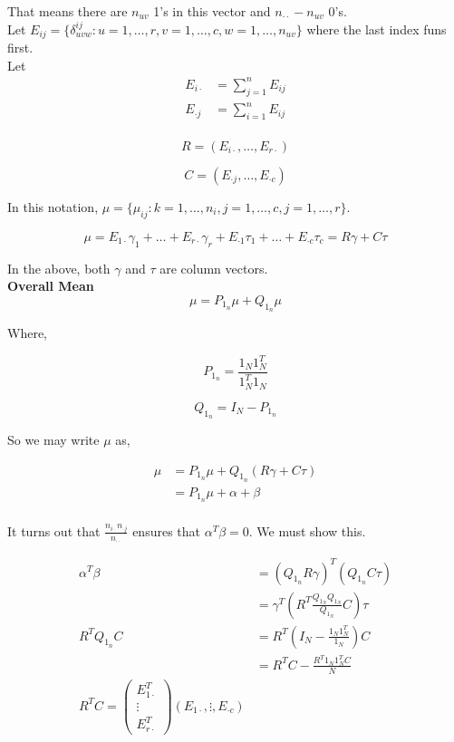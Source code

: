 \documentclass[11pt,fleqn]{book} %
\begin{document}
That means there are $n_{uv}$ 1's in this vector and $n_{\cdot \cdot} - n_{uv}$ 0's. \\

Let $E_{ij} = \{\delta^{ij}_{uvw}: u = 1, \dots, r, v = 1, \dots, c, w = 1, \dots, n_{uv}  \}$ where the last index funs first. \\

Let 	
		\begin{align}
			E_{i\cdot} &= \sum^n_{j=1} E_{ij}\\
			E_{\cdot j} &= \sum^n_{i=1} E_{ij}\\
		\end{align}


			$$R = \left(E_{i \cdot}, \dots, E_{r \cdot} \right) $$

			$$C = \left(E_{ \cdot j}, \dots, E_{\cdot c} \right) $$

In this notation, $\mu = \{\mu_{ij}: k = 1, \dots, n_i, j = 1, \dots, c, j = 1, \dots, r \}$. 

		$$\mu = E_{1\cdot} \gamma_1 + \dots + E_{r \cdot}\gamma_r + E_{\cdot 1} \tau_1 + \dots + E_{ \cdot c}\tau_c = R\gamma + C\tau $$

In the above, both $\gamma$ and $\tau$ are column vectors. \\

\textbf{Overall Mean}\\

		$$\mu = P_{1_n} \mu + Q_{1_n}\mu $$

Where, 

		$$P_{1_n} = \frac{1_N 1_N^T}{1_N^T 1_N} $$

		$$Q_{1_n} = I_N - P_{1_n} $$

So we may write $\mu$ as, 

	\begin{align*}
		 \mu &= P_{1_n} \mu + Q_{1_n}(R\gamma + C\tau)\\
		 		&= P_{1_n}\mu + \alpha + \beta\\
	\end{align*}

It turns out that $\frac{n_{i\cdot} n_{\cdot j}}{n_{\cdot \cdot}}$ ensures that $\alpha^T\beta = 0$. We must show this. 


		\begin{align*}
			\alpha^T\beta &= (Q_{1_n}R\gamma)^T(Q_{1_n} C \tau)\\
				&= \gamma^T (R^T \frac{Q_{1_N}Q_{1_N}}{Q_{1_N}} C ) \tau\\
			R^T Q_{1_n} C &= R^T (I_N - \frac{1_N 1_N^T}{1_N}) C \\
				&= R^T C  - \frac{R^T 1_N 1_N^T C}{N}\\
			R^T C = \begin{pmatrix}
				E_{1 \cdot}^T\\
				\vdots\\
				E_{r \cdot}^T
			\end{pmatrix} (E_{1 \cdot}, \vdots,	E_{ \cdot c})	
		\end{align*}
\end{document}
